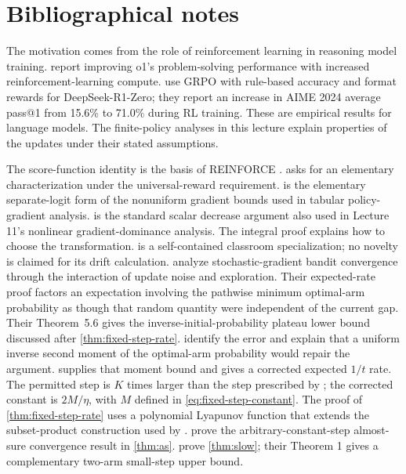 \documentclass[11pt,twoside]{article}
\theoremstyle{definition}
\theoremstyle{remark}
\begin{document}
\printendnotes

\section*{Bibliographical notes}
\label{sec:bibliography}

The motivation comes from the role of reinforcement learning in reasoning
model training. \citet{openai2024reasoning} report improving o1's
problem-solving performance with increased reinforcement-learning compute.
\citet{deepseek2025} use GRPO with rule-based accuracy and format rewards
for DeepSeek-R1-Zero; they report an increase in AIME 2024 average pass@1
from 15.6\% to 71.0\% during RL training. These are empirical results for
language models. The finite-policy analyses in this lecture explain
properties of the updates under their stated assumptions.

The score-function identity is the basis of REINFORCE
\citep{williams1992}.  asks for an elementary
characterization under the universal-reward requirement.
 is the elementary
separate-logit form of the nonuniform gradient bounds used in tabular
policy-gradient analysis.  is the standard scalar
decrease argument also used in Lecture 11's nonlinear gradient-dominance
analysis. The integral proof explains how to choose the transformation.
 is a self-contained classroom
specialization; no novelty is claimed for its drift calculation.
\citet{mei2024} analyze stochastic-gradient bandit convergence through
the interaction of update noise and exploration. Their expected-rate proof
factors an expectation involving the pathwise minimum optimal-arm probability
as though that random quantity were independent of the current gap.
Their Theorem~5.6 gives the inverse-initial-probability plateau lower bound
discussed after \cref{thm:fixed-step-rate}.
\citet[Appendix B.1]{baudry2025} identify the error and explain that a uniform
inverse second moment of the optimal-arm probability would repair the
argument.  supplies that moment bound and gives a
corrected expected $1/t$ rate. The permitted step is $K$ times larger than the
step prescribed by \citet{mei2024}; the corrected constant is $2M/\eta$, with
$M$ defined in \cref{eq:fixed-step-constant}. The proof of
\cref{thm:fixed-step-rate} uses a polynomial Lyapunov function that extends
the subset-product construction used by
\citet[Section 2.3]{jia2026}.  prove the
arbitrary-constant-step almost-sure convergence result in
\cref{thm:as}. \citet[Theorem 2]{baudry2025} prove
\cref{thm:slow}; their Theorem 1 gives a complementary two-arm small-step
upper bound.
\end{document}
